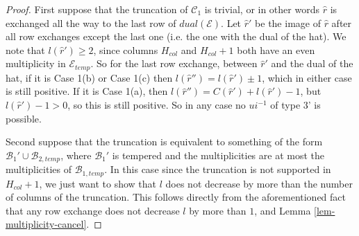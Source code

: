 \documentclass[11pt,letterpaper]{amsart}
\newcommand{\inv}{^{-1}}
\newcommand{\BB}{\mathcal{B}}
\newcommand{\CC}{\mathcal{C}}
\newcommand{\EE}{\mathcal{E}}
\numberwithin{equation}{section}
\begin{document}
\begin{proof}
    First suppose that the truncation of $\CC_1$ is trivial, or in other words $\widehat{r}$ is exchanged all the way to the last row of $dual(\EE)$. Let $\widehat{r}'$ be the image of $\widehat{r}$ after all row exchanges except the last one (i.e. the one with the dual of the hat). We note that $l(\widehat{r}') \geq 2$, since columns $H_{col}$ and $H_{col}+1$ both have an even multiplicity in $\EE_{temp}$. So for the last row exchange, between $\widehat{r}'$ and the dual of the hat, if it is Case 1(b) or Case 1(c) then $l(\widehat{r}'') = l(\widehat{r}') \pm 1$, which in either case is still positive. If it is Case 1(a), then $l(\widehat{r}'') = C(\widehat{r}') + l(\widehat{r}') - 1$, but $l(\widehat{r}') - 1>0$, so this is still positive. So in any case no $ui\inv$ of type 3' is possible.

    Second suppose that the truncation is equivalent to something of the form $\BB_1' \cup \BB_{2, temp}$, where $\BB_1'$ is tempered and the multiplicities are at most the multiplicities of $\BB_{1, temp}$. In this case since the truncation is not supported in $H_{col}+1$, we just want to show that $l$ does not decrease by more than the number of columns of the truncation. This follows directly from the aforementioned fact that any row exchange does not decrease $l$ by more than $1$, and Lemma \ref{lem-multiplicity-cancel}.


\end{proof}
\end{document}
